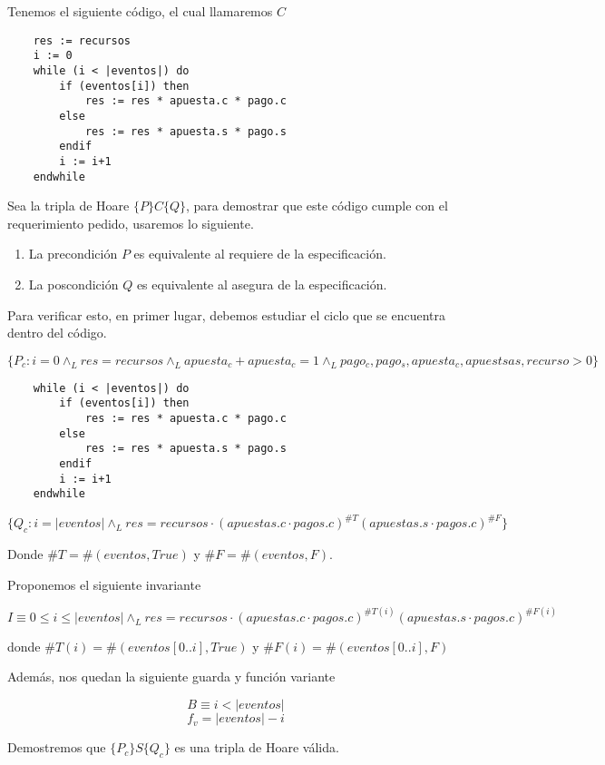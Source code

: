 \documentclass[../document.tex]{subfiles}
\begin{document}
Tenemos el siguiente código, el cual llamaremos $C$
\begin{verbatim}
    res := recursos
    i := 0
    while (i < |eventos|) do
        if (eventos[i]) then
            res := res * apuesta.c * pago.c
        else
            res := res * apuesta.s * pago.s
        endif
        i := i+1
    endwhile
\end{verbatim}

Sea la tripla de Hoare $\{P\}C\{Q\}$, para demostrar que este código cumple con el requerimiento pedido, usaremos lo siguiente.

\begin{enumerate}
    \item La precondición $P$ es equivalente al requiere de la especificación.
    \item La poscondición $Q$ es equivalente al asegura de la especificación.
\end{enumerate}

Para verificar esto, en primer lugar, debemos estudiar el ciclo que se encuentra dentro del código.

$\{P_c: i = 0 \land_{L} res = recursos \land_{L} apuesta_{c}+apuesta_{c}=1 \land_{L} pago_{c},pago_{s},apuesta_{c},apuestsa{s},recurso>0\}$

\begin{verbatim}
    while (i < |eventos|) do
        if (eventos[i]) then
            res := res * apuesta.c * pago.c
        else
            res := res * apuesta.s * pago.s
        endif
        i := i+1
    endwhile
\end{verbatim}

$\{Q_c: i = |eventos| \land_{L} res = recursos \cdot (apuestas.c\cdot pagos.c)^{\#T}(apuestas.s\cdot pagos.c)^{\#F}\}$

Donde $\#T = \#(eventos, True)$ y $\#F = \#(eventos, F)$. 

Proponemos el siguiente invariante

$$I \equiv 0\leq i \leq |eventos| \land_L res = recursos \cdot (apuestas.c\cdot pagos.c)^{\#T(i)}(apuestas.s\cdot pagos.c)^{\#F(i)}$$

donde $\#T(i) = \#(eventos[0..i], True)$ y $\#F(i) = \#(eventos[0..i], F)$

Además, nos quedan la siguiente guarda y función variante

$$B \equiv i < |eventos|$$
$$f_v = |eventos|-i$$

Demostremos que $\{P_c\}S\{Q_c\}$ es una tripla de Hoare válida.
\end{document}
